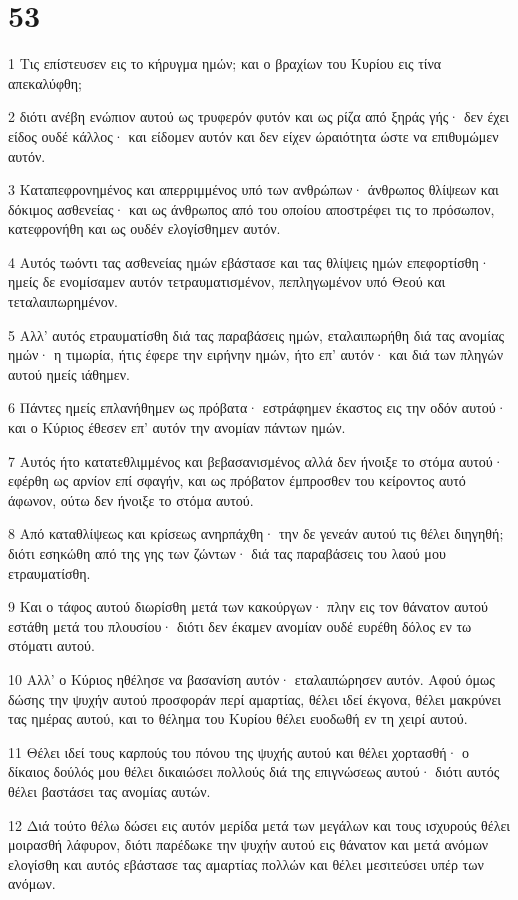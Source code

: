 \chapter{53}

\par 1 Τις επίστευσεν εις το κήρυγμα ημών; και ο βραχίων του Κυρίου εις τίνα απεκαλύφθη;
\par 2 διότι ανέβη ενώπιον αυτού ως τρυφερόν φυτόν και ως ρίζα από ξηράς γής· δεν έχει είδος ουδέ κάλλος· και είδομεν αυτόν και δεν είχεν ώραιότητα ώστε να επιθυμώμεν αυτόν.
\par 3 Καταπεφρονημένος και απερριμμένος υπό των ανθρώπων· άνθρωπος θλίψεων και δόκιμος ασθενείας· και ως άνθρωπος από του οποίου αποστρέφει τις το πρόσωπον, κατεφρονήθη και ως ουδέν ελογίσθημεν αυτόν.
\par 4 Αυτός τωόντι τας ασθενείας ημών εβάστασε και τας θλίψεις ημών επεφορτίσθη· ημείς δε ενομίσαμεν αυτόν τετραυματισμένον, πεπληγωμένον υπό Θεού και τεταλαιπωρημένον.
\par 5 Αλλ' αυτός ετραυματίσθη διά τας παραβάσεις ημών, εταλαιπωρήθη διά τας ανομίας ημών· η τιμωρία, ήτις έφερε την ειρήνην ημών, ήτο επ' αυτόν· και διά των πληγών αυτού ημείς ιάθημεν.
\par 6 Πάντες ημείς επλανήθημεν ως πρόβατα· εστράφημεν έκαστος εις την οδόν αυτού· και ο Κύριος έθεσεν επ' αυτόν την ανομίαν πάντων ημών.
\par 7 Αυτός ήτο κατατεθλιμμένος και βεβασανισμένος αλλά δεν ήνοιξε το στόμα αυτού· εφέρθη ως αρνίον επί σφαγήν, και ως πρόβατον έμπροσθεν του κείροντος αυτό άφωνον, ούτω δεν ήνοιξε το στόμα αυτού.
\par 8 Από καταθλίψεως και κρίσεως ανηρπάχθη· την δε γενεάν αυτού τις θέλει διηγηθή; διότι εσηκώθη από της γης των ζώντων· διά τας παραβάσεις του λαού μου ετραυματίσθη.
\par 9 Και ο τάφος αυτού διωρίσθη μετά των κακούργων· πλην εις τον θάνατον αυτού εστάθη μετά του πλουσίου· διότι δεν έκαμεν ανομίαν ουδέ ευρέθη δόλος εν τω στόματι αυτού.
\par 10 Αλλ' ο Κύριος ηθέλησε να βασανίση αυτόν· εταλαιπώρησεν αυτόν. Αφού όμως δώσης την ψυχήν αυτού προσφοράν περί αμαρτίας, θέλει ιδεί έκγονα, θέλει μακρύνει τας ημέρας αυτού, και το θέλημα του Κυρίου θέλει ευοδωθή εν τη χειρί αυτού.
\par 11 Θέλει ιδεί τους καρπούς του πόνου της ψυχής αυτού και θέλει χορτασθή· ο δίκαιος δούλός μου θέλει δικαιώσει πολλούς διά της επιγνώσεως αυτού· διότι αυτός θέλει βαστάσει τας ανομίας αυτών.
\par 12 Διά τούτο θέλω δώσει εις αυτόν μερίδα μετά των μεγάλων και τους ισχυρούς θέλει μοιρασθή λάφυρον, διότι παρέδωκε την ψυχήν αυτού εις θάνατον και μετά ανόμων ελογίσθη και αυτός εβάστασε τας αμαρτίας πολλών και θέλει μεσιτεύσει υπέρ των ανόμων.

